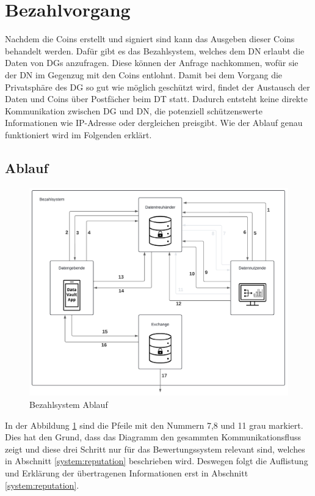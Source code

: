 \documentclass[
	fontsize=11pt,
	headings=small,
	parskip=half,           %
	bibliography=totoc,
	numbers=noenddot,       %
	open=any,               %
]{scrreprt}
\begin{document}
\section{Bezahlvorgang}
\label{system:payment}
Nachdem die Coins erstellt und signiert sind kann das Ausgeben dieser Coins behandelt werden. Dafür gibt es das Bezahlsystem, welches dem DN erlaubt die Daten von DGs anzufragen. Diese können der Anfrage nachkommen, wofür sie der DN im Gegenzug mit den Coins entlohnt. Damit bei dem Vorgang die Privatsphäre des DG so gut wie möglich geschützt wird, findet der Austausch der Daten und Coins über Postfächer beim DT statt. Dadurch entsteht keine direkte Kommunikation zwischen DG und DN, die potenziell schützenswerte Informationen wie IP-Adresse oder dergleichen preisgibt. Wie der Ablauf genau funktioniert wird im Folgenden erklärt.

\subsection{Ablauf}
\begin{figure}[H]
    \centering
    \includegraphics[width=0.9\linewidth]{PaymentDiagramm.pdf}
    \caption{Bezahlsystem Ablauf}
    \label{fig:payment}
\end{figure} 

In der Abbildung \ref{fig:payment} sind die Pfeile mit den Nummern 7,8 und 11 grau markiert. Dies hat den Grund, dass das Diagramm den gesammten Kommunikationsfluss zeigt und diese drei Schritt nur für das Bewertungssystem relevant sind, welches in Abschnitt \ref{system:reputation} beschrieben wird. Deswegen folgt die Auflistung und Erklärung der übertragenen Informationen erst in Abschnitt \ref{system:reputation}.
\end{document}

